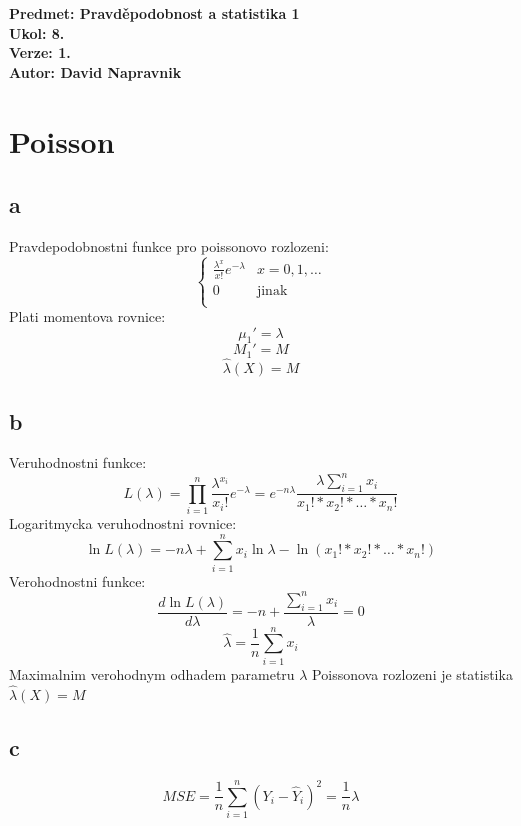 \documentclass[a4paper]{article}
\begin{document}
\noindent
\textbf{Predmet: Pravděpodobnost a statistika 1}\\
\textbf{Ukol: 8.}\\
\textbf{Verze: 1.}\\
\textbf{Autor: David Napravnik}

\section*{Poisson}

\subsection*{a}
Pravdepodobnostni funkce pro poissonovo rozlozeni:\\
\[
\begin{cases}
\frac{\lambda^x}{x!}e^{-\lambda}&\text{$x=0,1, \dots$}\\
0&\text{jinak}\\
\end{cases}
\]
Plati momentova rovnice:
$$\mu_1'=\lambda$$
$$M_1' = M$$
$$\hat{\lambda}(X)=M$$


\subsection*{b}
Veruhodnostni funkce:
$$
L(\lambda) = \prod^n_{i=1}\frac{\lambda^{x_i}}{x_i!}e^{-\lambda} = e^{-n\lambda}\frac{\lambda\sum^n_{i=1}x_i}{x_1!*x_2!* \dots *x_n!}
$$
Logaritmycka veruhodnostni rovnice:
$$
\ln L(\lambda)=-n\lambda+\sum^n_{i=1}x_i\ln\lambda-\ln(x_1!*x_2!* \dots *x_n!)
$$
Verohodnostni funkce:
$$
\frac{d\ln L(\lambda)}{d\lambda}=-n+\frac{\sum^n_{i=1}x_i}{\lambda} = 0
$$$$
\hat{\lambda}=\frac{1}{n}\sum^n_{i=1}x_i
$$
Maximalnim verohodnym odhadem parametru $\lambda$ Poissonova rozlozeni je statistika $\hat{\lambda}(X) = M$



\subsection*{c}
$$
MSE = \frac{1}{n}\sum^n_{i=1}(Y_i-\hat{Y}_i)^2=\frac{1}{n}\lambda
$$
\end{document}
